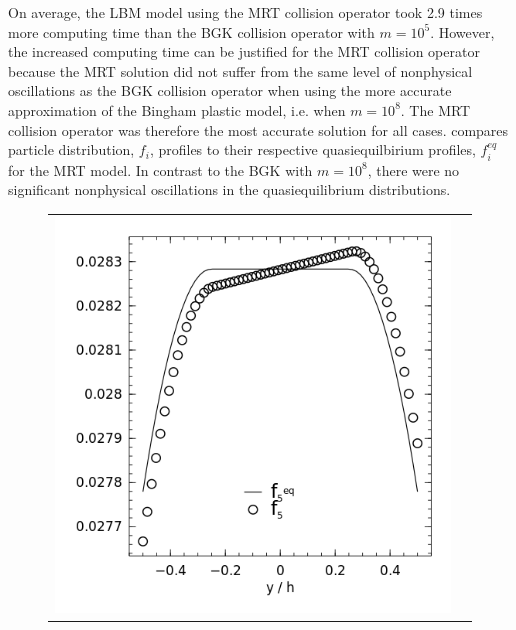 On average, the LBM model using the MRT collision operator took 2.9 times more computing time than the BGK collision operator with $m = 10^5$.
However, the increased computing time can be justified for the MRT collision operator because the MRT solution did not suffer from the same level of nonphysical oscillations as the BGK collision operator when using the more accurate approximation of the Bingham plastic model, i.e. when $m = 10^8$. 
The MRT collision operator was therefore the most accurate solution for all cases.
 compares particle distribution, $f_i$, profiles to their respective quasiequilbirium profiles, $f_i^{eq}$ for the MRT model.
In contrast to the BGK with $m = 10^8$, there were no significant nonphysical oscillations in the quasiequilibrium distributions.

\begin{figure}
	\centering
    \begin{tabulary}{\linewidth}{c c}
        \includegraphics[width=\figwid]{figs/poise-bingham/mrt/feq-vs-f_5.png}
        &

\end{tabulary}
\end{figure}
